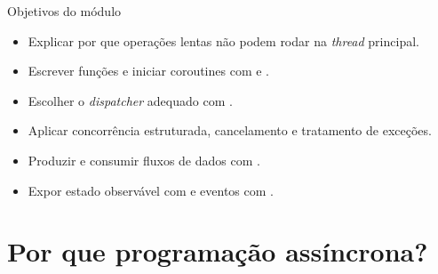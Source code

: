 \documentclass[aspectratio=169,10pt]{beamer}
\begin{document}
\capa

\begin{frame}{Objetivos do módulo}
  \begin{conceito}
    \begin{itemize}
      \item Explicar por que operações lentas não podem rodar na \emph{thread} principal.
      \item Escrever funções  e iniciar coroutines com  e .
      \item Escolher o \emph{dispatcher} adequado com .
      \item Aplicar concorrência estruturada, cancelamento e tratamento de exceções.
      \item Produzir e consumir fluxos de dados com .
      \item Expor estado observável com  e eventos com .
    \end{itemize}
  \end{conceito}
\end{frame}

\sumario



\section{Por que programação assíncrona?}
\end{document}
